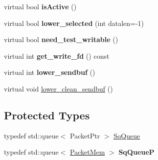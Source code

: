 \begin{DoxyCompactItemize}
\item 
virtual bool {\bfseries is\+Active} ()\hypertarget{classVsnetTCPSocket_a02bd2bab8bea7617def4af71950bf5fd}{}\label{classVsnetTCPSocket_a02bd2bab8bea7617def4af71950bf5fd}

\item 
virtual bool {\bfseries lower\+\_\+selected} (int datalen=-\/1)\hypertarget{classVsnetTCPSocket_ae5ad04b31bdd349f5f869846e312aece}{}\label{classVsnetTCPSocket_ae5ad04b31bdd349f5f869846e312aece}

\item 
virtual bool {\bfseries need\+\_\+test\+\_\+writable} ()\hypertarget{classVsnetTCPSocket_aebf20c102f4e25313dd2f35cfc8efbca}{}\label{classVsnetTCPSocket_aebf20c102f4e25313dd2f35cfc8efbca}

\item 
virtual int {\bfseries get\+\_\+write\+\_\+fd} () const \hypertarget{classVsnetTCPSocket_abc51aa3ff42496826fcbafce07c20ed9}{}\label{classVsnetTCPSocket_abc51aa3ff42496826fcbafce07c20ed9}

\item 
virtual int {\bfseries lower\+\_\+sendbuf} ()\hypertarget{classVsnetTCPSocket_a9bfdfbc3629bab6fdc97df7581438ecf}{}\label{classVsnetTCPSocket_a9bfdfbc3629bab6fdc97df7581438ecf}

\item 
virtual void \hyperlink{classVsnetTCPSocket_a402b9a9cf439bfb0bcde7a94b9436dd7}{lower\+\_\+clean\+\_\+sendbuf} ()
\end{DoxyCompactItemize}
\subsection*{Protected Types}
\begin{DoxyCompactItemize}
\item 
typedef std\+::queue$<$ Packet\+Ptr $>$ \hyperlink{classVsnetTCPSocket_ad37e20c520afe909bb64e9c6dab46392}{Sq\+Queue}
\item 
typedef std\+::queue$<$ \hyperlink{classPacketMem}{Packet\+Mem} $>$ {\bfseries Sq\+QueueP}\hypertarget{classVsnetTCPSocket_a4771ac3a9864b42b841fc2f804b79d44}{}\label{classVsnetTCPSocket_a4771ac3a9864b42b841fc2f804b79d44}

\end{DoxyCompactItemize}
